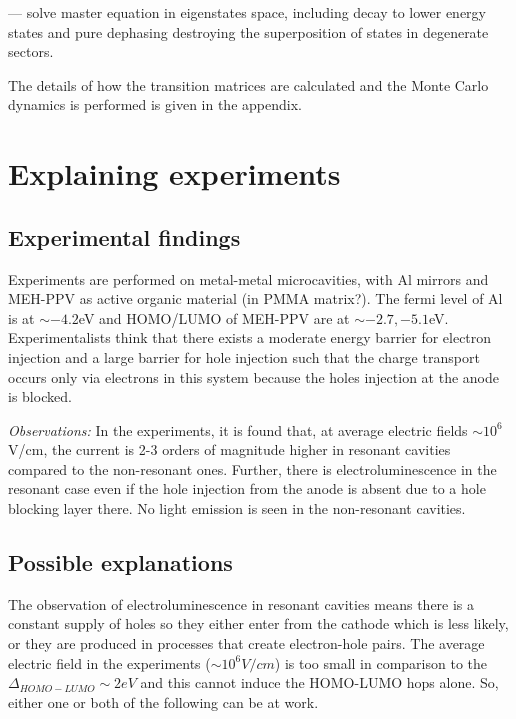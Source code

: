 \documentclass[a4paper,twocolumn]{revtex4-1} %
\begin{document}
--- solve master equation in eigenstates space, including decay to lower energy states
and pure dephasing destroying the superposition of states in degenerate sectors.














The details of how the transition matrices are calculated and the Monte Carlo dynamics is performed
is given in the appendix. 



\section{Explaining experiments}

\subsection{Experimental findings}
Experiments are performed on metal-metal microcavities, with Al mirrors and MEH-PPV as active organic material (in PMMA matrix?). 
The fermi level of Al is at $\sim -4.2$eV and 
HOMO/LUMO of MEH-PPV are at $\sim -2.7,-5.1$eV.
Experimentalists think that there exists a moderate energy barrier for electron injection and a large barrier for hole injection such that the charge transport occurs only via electrons in this system because the holes injection at the anode is blocked.

{\it Observations:}
In the experiments, it is found that, at average electric fields $\sim 10^6$V/cm, the current is 2-3 orders of magnitude higher in resonant cavities compared to the non-resonant ones. Further, there is electroluminescence in the resonant case even if the hole injection from the anode is absent due to a hole blocking layer there. No light emission is seen in the non-resonant cavities.

\subsection{Possible explanations}
\label{subsec:zener}
The observation of electroluminescence in resonant cavities means there is a constant supply of holes so they either enter from the cathode which is less likely, or they are produced in processes that create electron-hole pairs.
The average electric field in the experiments ($\sim 10^6 V/cm$) 
is too small in comparison to the 
$\Delta_{HOMO-LUMO}\sim 2eV$
 and this cannot induce the HOMO-LUMO hops alone.
 So, either one or both of the following can be at work.
 
\end{document}
